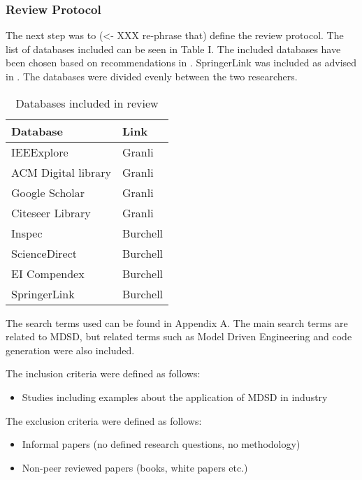 \documentclass[10pt,twocolumn]{article}
\begin{document}
\subsubsection{Review Protocol}
The next step was to (<- XXX re-phrase that) define the review protocol. The list of databases included can be seen in Table I. The included databases have been chosen based on recommendations in \cite{brereton2007lessons}. SpringerLink was included as advised in \cite{kitchenham2007guidelines}. The databases were divided evenly between the two researchers. 

\begin{table}[ht]
	\centering
	\begin{tabular}{|l|l|} 
		\hline
		\textbf{Database} & \textbf{Link}  \\
		\hline
		IEEExplore &  Granli \\
		\hline
		ACM Digital library &  Granli \\
		\hline
		Google Scholar &  Granli \\
		\hline
		Citeseer Library & Granli \\
		\hline
		Inspec &  Burchell \\
		\hline
		ScienceDirect & Burchell \\
		\hline
		EI Compendex &  Burchell \\
		\hline
		SpringerLink & Burchell \\
		\hline
	\end{tabular}
	\caption{Databases included in review}
\end{table}

The search terms used can be found in Appendix A. The main search terms are related to MDSD, but related terms such as Model Driven Engineering and code generation were also included. 

The inclusion criteria were defined as follows: \newline
\begin{itemize} 
\item Studies including examples about the application of MDSD in industry
\end{itemize}

The exclusion criteria were defined as follows: \newline
\begin{itemize}
\item Informal papers (no defined research questions, no methodology)
\item Non-peer reviewed papers (books, white papers etc.)
\end{itemize}
\end{document}
